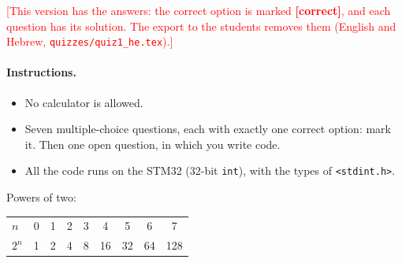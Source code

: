 \documentclass[11pt,a4paper]{article}
\newcommand{\flag}[1]{\textcolor{red}{[#1]}}
\newenvironment{solution}{\par\noindent\ignorespaces}{\par}
\begin{document}
\begin{solution}
\flag{This version has the answers: the correct option is marked \textcolor{green!50!black}{\textbf{[correct]}}, and
each question has its solution. The export to the students removes them (English and Hebrew,
\texttt{quizzes/quiz1\_he.tex}).}
\end{solution}

\paragraph{Instructions.}
\begin{itemize}
  \item No calculator is allowed.
  \item Seven multiple-choice questions, each with exactly one correct option: mark it. Then one open question, in
        which you write code.
  \item All the code runs on the STM32 (32-bit \texttt{int}), with the types of \texttt{<stdint.h>}.
\end{itemize}

\smallskip\noindent Powers of two:
\begin{center}
\begin{tabular}{l*{8}{c}}
\toprule
$n$   & 0 & 1 & 2 & 3 & 4 & 5 & 6 & 7 \\
$2^n$ & 1 & 2 & 4 & 8 & 16 & 32 & 64 & 128 \\
\bottomrule
\end{tabular}
\end{center}
\end{document}
